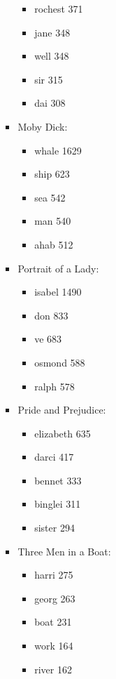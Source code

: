\documentclass[a4paper,11pt,oneside]{book}
\begin{document}
\begin{enumerate}
\begin{enumerate}
\begin{itemize}
												\begin{itemize}
													\item{rochest	371}
													\item{jane		348}
													\item{well		348}
													\item{sir	315}
													\item{dai	308}
												\end{itemize}
									\item Moby Dick:
												\begin{itemize}
													\item{whale	1629}
													\item{ship		623}
													\item{sea		542}
													\item{man		540}
													\item{ahab	512}
												\end{itemize}
									\item Portrait of a Lady:
												\begin{itemize}
													\item{isabel	1490}
													\item{don		833}
													\item{ve		683}
													\item{osmond	588}
													\item{ralph	578}
												\end{itemize}
									\item Pride and Prejudice:
												\begin{itemize}
													\item{elizabeth	635}
													\item{darci	417}
													\item{bennet	333}
													\item{binglei	311}
													\item{sister	294}
												\end{itemize}
									\item Three Men in a Boat:
												\begin{itemize}
													\item{harri		275}
													\item{georg	263}
													\item{boat		231}
													\item{work	164}
													\item{river	162}
												\end{itemize}
								\end{itemize}
					\end{enumerate}
					

\end{enumerate}
\end{document}
